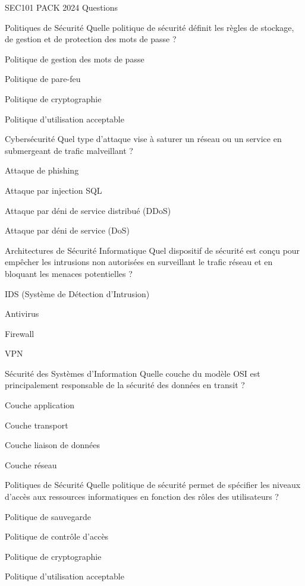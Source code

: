 \documentclass[12pt]{article}
\begin{document}
\begin{quiz}{SEC101 PACK 2024 Questions}
  \begin{multi}[points=1]{Politiques de Sécurité}
    Quelle politique de sécurité définit les règles de stockage, de gestion et de protection des mots de passe ?
    \item* Politique de gestion des mots de passe
    \item Politique de pare-feu
    \item Politique de cryptographie
    \item Politique d'utilisation acceptable
  \end{multi}
  
  \begin{multi}[points=1]{Cybersécurité}
    Quel type d'attaque vise à saturer un réseau ou un service en submergeant de trafic malveillant ?
    \item Attaque de phishing
    \item Attaque par injection SQL
    \item Attaque par déni de service distribué (DDoS)
    \item* Attaque par déni de service (DoS)
  \end{multi}

  \begin{multi}[points=1]{Architectures de Sécurité Informatique}
    Quel dispositif de sécurité est conçu pour empêcher les intrusions non autorisées en surveillant le trafic réseau et en bloquant les menaces potentielles ?
    \item* IDS (Système de Détection d'Intrusion)
    \item Antivirus
    \item Firewall
    \item VPN
  \end{multi}

  \begin{multi}[points=1]{Sécurité des Systèmes d'Information}
    Quelle couche du modèle OSI est principalement responsable de la sécurité des données en transit ?
    \item* Couche application
    \item Couche transport
    \item Couche liaison de données
    \item* Couche réseau
  \end{multi}

  \begin{multi}[points=1]{Politiques de Sécurité}
    Quelle politique de sécurité permet de spécifier les niveaux d'accès aux ressources informatiques en fonction des rôles des utilisateurs ?
    \item Politique de sauvegarde
    \item* Politique de contrôle d'accès
    \item Politique de cryptographie
    \item Politique d'utilisation acceptable
  \end{multi}


\end{quiz}
\end{document}
